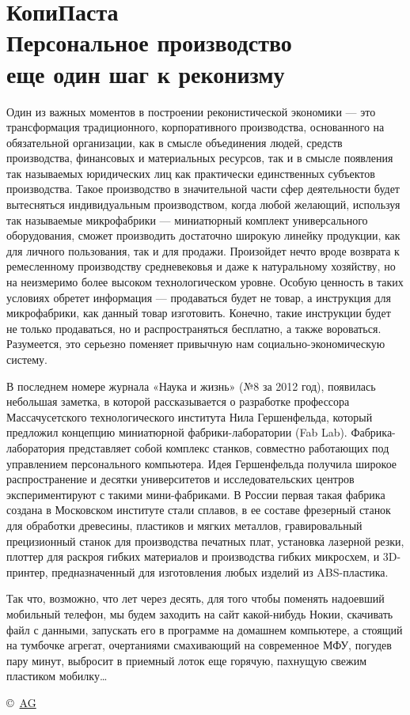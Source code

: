 \documentclass{magazine}
\begin{document}
\section{КопиПаста\\Персональное производство\\еще один шаг к реконизму}
\begin{multicols}{2}

Один из важных моментов в построении реконистической экономики — это
трансформация традиционного, корпоративного производства, основанного на
обязательной организации, как в смысле объединения людей, средств производства,
финансовых и материальных ресурсов, так и в смысле появления так называемых
юридических лиц как практически единственных субъектов производства. Такое
производство в значительной части сфер деятельности будет вытесняться
индивидуальным производством, когда  любой желающий, используя так называемые
микрофабрики — миниатюрный комплект универсального оборудования, сможет
производить достаточно широкую линейку продукции, как для личного пользования,
так и для продажи. Произойдет нечто вроде возврата к ремесленному производству
средневековья и даже к натуральному хозяйству, но на неизмеримо более высоком
технологическом уровне. Особую ценность в таких условиях обретет информация —
продаваться будет не товар, а инструкция для микрофабрики, как данный товар
изготовить. Конечно, такие инструкции будет не только продаваться, но и
распространяться бесплатно, а также вороваться. Разумеется, это серьезно
поменяет привычную нам социально-экономическую систему.

В последнем номере журнала «Наука и жизнь» (№8 за 2012 год), появилась небольшая
заметка, в которой рассказывается о разработке профессора Массачусетского
технологического института Нила Гершенфельда, который предложил концепцию
миниатюрной фабрики-лаборатории (Fab Lab). Фабрика-лаборатория представляет
собой комплекс станков, совместно работающих под управлением персонального
компьютера. Идея Гершенфельда получила широкое распространение и десятки
университетов и исследовательских центров экспериментируют с такими
мини-фабриками. В России первая такая фабрика создана в Московском институте
стали сплавов, в ее составе фрезерный станок для обработки древесины, пластиков
и мягких металлов, гравировальный прецизионный станок для производства печатных
плат, установка лазерной резки, плоттер для раскроя гибких материалов и
производства гибких микросхем, и 3D-принтер, предназначенный для изготовления
любых изделий из ABS-пластика.

Так что, возможно, что лет через десять, для того чтобы поменять надоевший
мобильный телефон, мы будем заходить на сайт какой-нибудь Нокии, скачивать файл
с данными, запускать его в программе на домашнем компьютере, а стоящий на
тумбочке агрегат, очертаниями смахивающий на современное МФУ, погудев пару
минут, выбросит в приемный лоток еще горячую, пахнущую свежим пластиком
мобилку\ldots
\smiley

\bigskip
\copyright\
\href{http://blog42.ws/personalnoe-proizvodstvo-eshhe-odin-shag-k-rekonizmu/}{AG}

\end{multicols}
\end{document}
